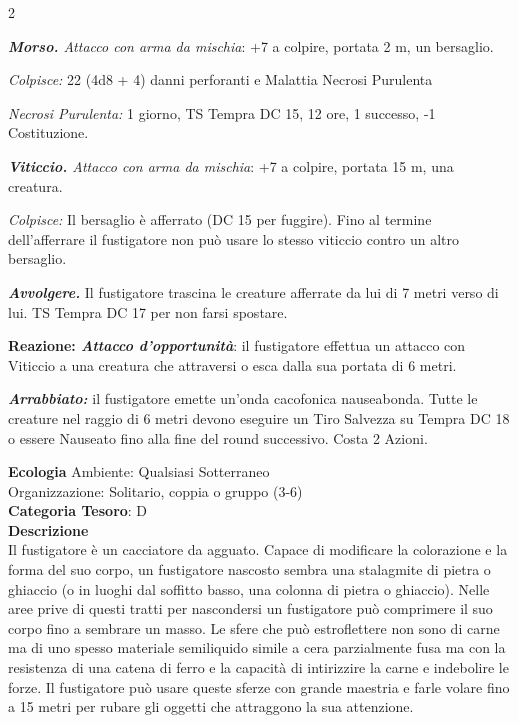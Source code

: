 \begin{multicols}{2}
{\emph{\textbf{Morso.} Attacco con arma da mischia}: +7 a colpire, portata 2 m, un bersaglio.

\emph{Colpisce:} 22 (4d8 + 4) danni perforanti e Malattia Necrosi Purulenta

\emph{Necrosi Purulenta:} 1 giorno, TS Tempra DC 15, 12 ore, 1 successo, -1 Costituzione.

\emph{\textbf{Viticcio.} Attacco con arma da mischia}: +7 a colpire, portata 15 m, una creatura.

\emph{Colpisce:} Il bersaglio è afferrato (DC 15 per fuggire). Fino al termine dell'afferrare il fustigatore non può usare lo stesso viticcio contro un altro bersaglio.

\emph{\textbf{Avvolgere.}} Il fustigatore trascina le creature afferrate da lui di 7 metri verso di lui. TS Tempra DC 17 per non farsi spostare.

\textbf{Reazione: \emph{Attacco d'opportunità}}: il fustigatore effettua un attacco con Viticcio a una creatura che attraversi o esca dalla sua portata di 6 metri.

\emph{\textbf{Arrabbiato:}} il fustigatore emette un'onda cacofonica nauseabonda. Tutte le creature nel raggio di 6 metri devono eseguire un Tiro Salvezza su Tempra DC 18 o essere Nauseato fino alla fine del round successivo. Costa 2 Azioni.

\textbf{Ecologia}
Ambiente: Qualsiasi Sotterraneo\\
Organizzazione: Solitario, coppia o gruppo (3-6)\\
\textbf{Categoria Tesoro}: D\\
\textbf{Descrizione}\\
Il fustigatore è un cacciatore da agguato. Capace di modificare la colorazione e la forma del suo corpo, un fustigatore nascosto sembra una stalagmite di pietra o ghiaccio (o in luoghi dal soffitto basso, una colonna di pietra o ghiaccio). Nelle aree prive di questi tratti per nascondersi un fustigatore può comprimere il suo corpo fino a sembrare un masso. Le sfere che può estroflettere non sono di carne ma di uno spesso materiale semiliquido simile a cera parzialmente fusa ma con la resistenza di una catena di ferro e la capacità di intirizzire la carne e indebolire le forze. Il fustigatore può usare queste sferze con grande maestria e farle volare fino a 15 metri per rubare gli oggetti che attraggono la sua attenzione.

}
\end{multicols}
